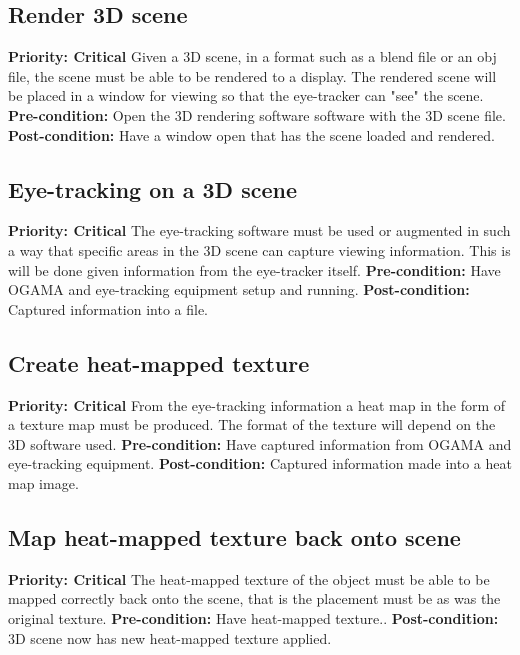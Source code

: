 \subsection{Render 3D scene}
    \textbf{Priority: Critical}\newline
    Given a 3D scene, in a format such as a blend file or an obj file, the scene must be able to be rendered to a display. The rendered scene will be placed in a window for viewing so that the eye-tracker can "see" the scene.\newline
    \textbf{Pre-condition: }
    Open the 3D rendering software software with the 3D scene file.\newline
    \textbf{Post-condition: }
    Have a window open that has the scene loaded and rendered.
    
\subsection{Eye-tracking on a 3D scene}
    \textbf{Priority: Critical}\newline
    The eye-tracking software must be used or augmented in such a way that specific areas in the 3D scene can capture viewing information. This is will be done given information from the eye-tracker itself.\newline
    \textbf{Pre-condition: }
    Have OGAMA and eye-tracking equipment setup and running.\newline
    \textbf{Post-condition: }
    Captured information into a file.
    
\subsection{Create heat-mapped texture}
    \textbf{Priority: Critical}\newline
    From the eye-tracking information a heat map in the form of a texture map must be produced. The format of the texture will depend on the 3D software used.\newline
    \textbf{Pre-condition: }
    Have captured information from OGAMA and eye-tracking equipment.\newline
    \textbf{Post-condition: }
    Captured information made into a heat map image.
    
\subsection{Map heat-mapped texture back onto scene}
    \textbf{Priority: Critical}\newline
    The heat-mapped texture of the object must be able to be mapped correctly back onto the scene, that is the placement must be as was the original texture.\newline
    \textbf{Pre-condition: }
    Have heat-mapped texture..\newline
    \textbf{Post-condition: }
    3D scene now has new heat-mapped texture applied.
    
